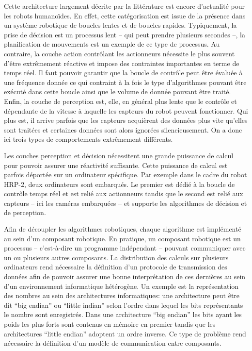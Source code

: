 Cette architecture largement décrite par la littérature est encore
d'actualité pour les robots humanoïdes. En effet, cette catégorisation
est issue de la présence dans un système robotique de boucles lentes
et de boucles rapides. Typiquement, la prise de décision est un
processus lent -- qui peut prendre plusieurs secondes --, la
planification de mouvements est un exemple de ce type de processus. Au
contraire, la couche action contrôlant les actionneurs nécessite le
plus souvent d'être extrêmement réactive et impose des contraintes
importantes en terme de temps réel. Il faut pouvoir garantir que la
boucle de contrôle peut être évaluée à une fréquence donnée ce qui
contraint à la fois le type d'algorithmes pouvant être exécuté dans
cette boucle ainsi que le volume de donnée pouvant être traité. Enfin,
la couche de perception est, elle, en général plus lente que le
contrôle et dépendante de la vitesse à laquelle les capteurs du robot
peuvent fonctionner. Qui plus est, il arrive parfois que les capteurs
acquièrent des données plus vite qu'elles sont traitées et certaines
données sont alors ignorées silencieusement. On a donc ici trois types
de comportements extrêmement différents.


Les couches perception et décision nécessitent une grande puissance de
calcul pour pouvoir assurer une réactivité suffisante. Cette puissance
de calcul est parfois déportée sur un ordinateur spécifique. Par
exemple dans le cadre du robot HRP-2, deux ordinateurs sont
embarqués. Le premier est dédié à la boucle de contrôle temps réel et
est relié aux actionneurs tandis que le second est relié aux capteurs
-- ici les caméras embarquées -- et supporte les algorithmes de
décision et de perception.


Afin de découpler les algorithmes robotiques, chaque algorithme est
implémenté au sein d'un composant robotique. En pratique, un
composant robotique est un processus -- c'est-à-dire un programme
indépendant -- pouvant communiquer avec un ou plusieurs autres
composants. La distribution des calculs sur plusieurs ordinateurs rend
nécessaire la définition d'un protocole de transmission des données
afin de pouvoir assurer une bonne interprétation de ces dernières au
sein d'un environnement informatique hétérogène. Un exemple est la
représentation des nombres au sein des architectures informatiques:
une architecture peut être dit ``big endian'' ou ``little indian'' selon l'ordre dans lequel les bits représentants le
nombre sont enregistrés. Dans une architecture ``big endian'' les
bits ayant les poids les plus forts sont contenus en mémoire en
premier tandis que les architectures ``little endian'' adoptent un
ordre inverse. Ce type de problème rend nécessaire la définition d'un
modèle de communication entre composants.


